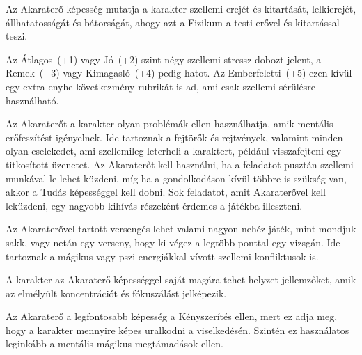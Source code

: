
Az Akaraterő képesség mutatja a karakter szellemi erejét és kitartását, lelkierejét, állhatatosságát és bátorságát, ahogy azt a Fizikum a testi erővel és kitartással teszi.

Az Átlagos~(+1) vagy Jó~(+2) szint négy szellemi stressz dobozt jelent, a Remek~(+3) vagy Kimagasló~(+4) pedig hatot. Az Emberfeletti~(+5) ezen kívül egy extra enyhe következmény rubrikát is ad, ami csak szellemi sérülésre használható.

\overcome Az Akaraterőt a karakter olyan problémák ellen használhatja, amik mentális erőfeszítést igényelnek. Ide tartoznak a fejtörők és rejtvények, valamint minden olyan cselekedet, ami szellemileg leterheli a karaktert, például visszafejteni egy titkosított üzenetet. Az Akaraterőt kell használni, ha a feladatot pusztán szellemi munkával le lehet küzdeni, míg ha a gondolkodáson kívül többre is szükség van, akkor a Tudás képességgel kell dobni. Sok feladatot, amit Akaraterővel kell leküzdeni, egy nagyobb kihívás részeként érdemes a játékba illeszteni.

Az Akaraterővel tartott versengés lehet valami nagyon nehéz játék, mint mondjuk sakk, vagy netán egy verseny, hogy ki végez a legtöbb ponttal egy vizsgán. Ide tartoznak a mágikus vagy pszi energiákkal vívott szellemi konfliktusok is.

\advantage A karakter az Akaraterő képességgel saját magára tehet helyzet jellemzőket, amik az elmélyült koncentrációt és fókuszálást jelképezik.

\noattack

 Az Akaraterő a legfontosabb képesség a Kényszerítés ellen, mert ez adja meg, hogy a karakter mennyire képes uralkodni a viselkedésén. Szintén ez használatos leginkább a mentális mágikus megtámadások ellen.



